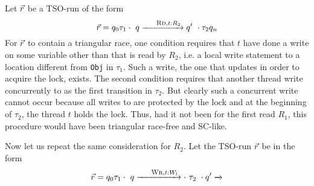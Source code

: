 \documentclass[preprint,9pt]{sigplanconf}
\begin{document}
Let $\vec{r}$ be a TSO-run of the form 
\[
\alisequencex r = q_0\tau_1\cdot\ q\xrightarrow{\textnormal{\sc\small Rd},t:R_2}q'\ \cdot\tau_2q_n
\]
For $\vec{r}$ to contain a triangular race, one condition requires that $t$ have done a write on some variable other than that is read by $R_2$, i.e. a local write statement to a location different from {\tt Obj} in $\tau_1$.
Such a write, the one that updates {} in order to acquire the lock, exists.
The second condition requires that another thread write concurrently to {} as the first transition in $\tau_2$.
But clearly such a concurrent write cannot occur because all writes to {} are protected by the lock and at the beginning of $\tau_2$, the thread $t$ holds the lock.
Thus, had it not been for the first read $R_1$, this procedure would have been triangular race-free and SC-like.

Now let us repeat the same consideration for $R_2$.
Let the TSO-run $\vec{r}$ be in the form
\[
\alisequencex r = q_0\tau_1\cdot\ q\xrightarrow{\textnormal{\sc\small Wr},t:W_l}\cdot\ \tau_2\ \cdot q'\xrightarrow{}
\]



\end{document}
